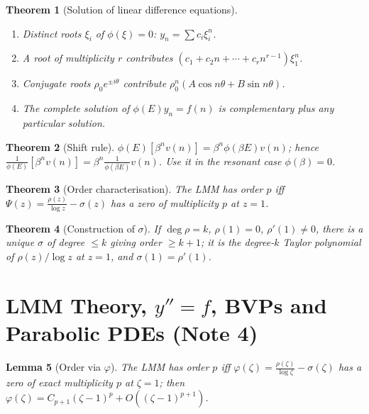 \documentclass[10pt,a4paper]{article}
\theoremstyle{tight}
\newtheorem{theorem}{Theorem}[section]
\newtheorem{lemma}[theorem]{Lemma}
\begin{document}
\begin{theorem}[Solution of linear difference equations]
\leavevmode
\begin{enumerate}
  \item Distinct roots \(\xi_i\) of \(\phi(\xi)=0\): \(y_n=\sum c_i\xi_i^n\).
  \item A root of multiplicity \(r\) contributes \((c_1+c_2n+\cdots+c_rn^{r-1})\xi_1^n\).
  \item Conjugate roots \(\rho_0e^{\pm i\theta}\) contribute \(\rho_0^n(A\cos n\theta+B\sin n\theta)\).
  \item The complete solution of \(\phi(E)y_n=f(n)\) is complementary plus any particular solution.
\end{enumerate}
\end{theorem}

\begin{theorem}[Shift rule]
\(\phi(E)[\beta^nv(n)]=\beta^n\phi(\beta E)v(n)\); hence
\(\frac1{\phi(E)}[\beta^nv(n)]=\beta^n\frac1{\phi(\beta E)}v(n)\). Use it in the resonant case
\(\phi(\beta)=0\).
\end{theorem}

\begin{theorem}[Order characterisation]
The LMM has order \(p\) iff \(\Psi(z)=\frac{\rho(z)}{\log z}-\sigma(z)\) has a zero of
multiplicity \(p\) at \(z=1\).
\end{theorem}

\begin{theorem}[Construction of \(\sigma\)]
If \(\deg\rho=k\), \(\rho(1)=0\), \(\rho'(1)\ne0\), there is a unique \(\sigma\) of degree \(\le k\)
giving order \(\ge k+1\); it is the degree-\(k\) Taylor polynomial of \(\rho(z)/\log z\) at \(z=1\),
and \(\sigma(1)=\rho'(1)\).
\end{theorem}

\section{LMM Theory, \(y''=f\), BVPs and Parabolic PDEs (Note 4)}

\begin{lemma}[Order via \(\varphi\)]
The LMM has order \(p\) iff \(\varphi(\zeta)=\frac{\rho(\zeta)}{\log\zeta}-\sigma(\zeta)\) has a zero
of exact multiplicity \(p\) at \(\zeta=1\); then \(\varphi(\zeta)=C_{p+1}(\zeta-1)^p+O((\zeta-1)^{p+1})\).
\end{lemma}
\end{document}
